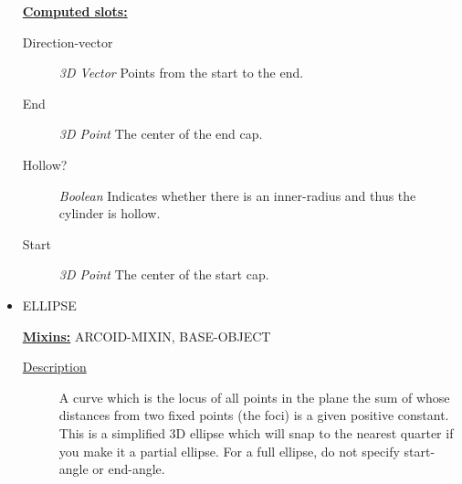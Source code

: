 \documentclass [11pt]{book}
\begin{document}
\begin{itemize}
\begin{description}
\end{description}






\textbf{
\underline{Computed slots:}}

\begin{description}

\item [Direction-vector]
\emph{3D Vector} Points from the start to the end.


\item [End]
\emph{3D Point} The center of the end cap.


\item [Hollow?]
\emph{Boolean} Indicates whether there is an inner-radius and thus the cylinder is hollow.


\item [Start]
\emph{3D Point} The center of the start cap.


\end{description}







\item {}ELLIPSE


\textbf{
\underline{Mixins:}} ARCOID-MIXIN, BASE-OBJECT





\begin{description}

\item [
\underline{Description}]


A curve which is the locus of all points in the plane 
the sum of whose distances from two fixed points (the foci) is a given positive constant.
This is a simplified 3D ellipse which will snap to the nearest quarter if you make it a 
partial ellipse. For a full ellipse, do not specify start-angle or end-angle.



\end{description}




\begin{figure}
\begin{lrbox}{\boxedverb}
\begin{minipage}{\linewidth}
{\small

}
\end{minipage}
\end{lrbox}
\end{figure}
\end{itemize}
\end{document}
